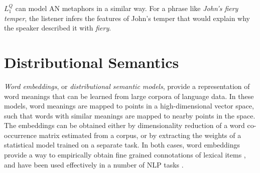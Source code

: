 \documentclass[9pt,twocolumn,twoside,lineno]{pnas-new}
\newcommand{\Listener}{L}
\newcommand{\QLONE}{\Listener_{{1}}^{{Q}}}
\begin{document}
	



	$\QLONE$ can model AN metaphors in a similar way. For a phrase like \emph{John's fiery temper}, the listener infers the features of John's temper that would explain why the speaker described it with \emph{fiery}.


	\section{Distributional Semantics} \label{distmods}


	\emph{Word embeddings}, or \emph{distributional semantic models}, provide a representation of word meanings that can be learned from large corpora of language data. In these models, word meanings are mapped to points in a high-dimensional vector space, such that words with similar meanings are mapped to nearby points in the space. The embeddings can be obtained either by dimensionality reduction of a word co-occurrence matrix \cite{pennington2014glove} estimated from a corpus, or by extracting the weights of a statistical model \cite{mikolov2013distributed,peters2018deep,devlin2018bert} trained on a separate task. In both cases, word embeddings provide a way to empirically obtain fine grained connotations of lexical items \cite{mikolov2013distributed}, and have been used effectively in a number of NLP tasks \cite{dai2015semi,radford2018improving,socher2013recursive}. 
\end{document}
